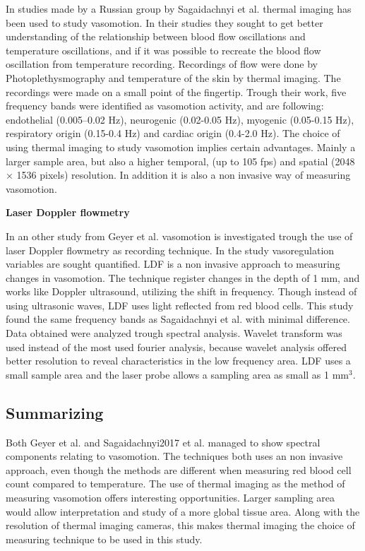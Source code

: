 In studies made by a Russian group by Sagaidachnyi et al. thermal imaging has been used to study vasomotion. In their studies they sought to get better understanding of the relationship between blood flow oscillations and temperature oscillations, and if it was possible to recreate the blood flow oscillation from temperature recording. Recordings of flow were done by Photoplethysmography and temperature of the skin by thermal imaging. The recordings were made on a small point of the fingertip. Trough their work, five frequency bands were identified as vasomotion activity, and are following: endothelial (0.005–0.02 Hz), neurogenic (0.02-0.05 Hz), myogenic (0.05-0.15 Hz), respiratory origin (0.15-0.4 Hz) and cardiac origin (0.4-2.0 Hz).\cite{sagaidachnyi2017,sagaidachnyi2014}
The choice of using thermal imaging to study vasomotion implies certain advantages. Mainly a larger sample area, but also a higher temporal, (up to 105 fps) and spatial (2048 × 1536 pixels) resolution. In addition it is also a non invasive way of measuring vasomotion.\cite{sagaidachnyi2017}





\textbf{Laser Doppler flowmetry}

In an other study from Geyer et al. vasomotion is investigated trough the use of laser Doppler flowmetry as recording technique. In the study vasoregulation variables are sought quantified. LDF is a non invasive approach to measuring changes in vasomotion. The technique register changes in the depth of 1 mm, and works like Doppler ultrasound, utilizing the shift in frequency. Though instead of using ultrasonic waves, LDF uses light reflected from red blood cells. This study found the same frequency bands as Sagaidachnyi et al. with minimal difference. Data obtained were analyzed trough spectral analysis. Wavelet transform was used instead of the most used fourier analysis, because wavelet analysis offered better resolution to reveal characteristics in the low frequency area.\cite{geyer2004}
LDF uses a small sample area and the laser probe allows a sampling area as small as 1 mm$^3$.\cite{brothers2010} 


  
\subsection{Summarizing}

Both Geyer et al. and Sagaidachnyi2017 et al. managed to show spectral components relating to vasomotion. The techniques both uses an non invasive approach, even though the methods are different when measuring red blood cell count compared to temperature. The use of thermal imaging as the method of measuring vasomotion offers interesting opportunities. Larger sampling area would allow interpretation and study of a more global tissue area. Along with the resolution of thermal imaging cameras, this makes thermal imaging the choice of measuring technique to be used in this study. 



